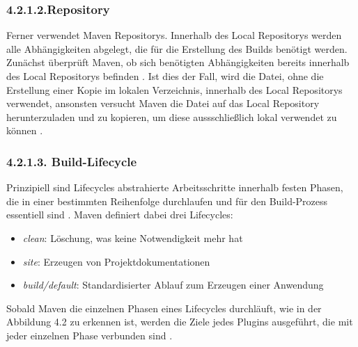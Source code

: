 \subsubsection{4.2.1.2.Repository}

Ferner verwendet Maven Repositorys. Innerhalb des Local Repositorys werden alle Abhängigkeiten abgelegt, die für die Erstellung des Builds benötigt werden. Zunächst überprüft Maven, ob sich benötigten Abhängigkeiten bereits innerhalb des Local Repositorys befinden \cite[S. 45 - 47]{loukides_maven_2008}. Ist dies der Fall, wird die Datei, ohne die Erstellung einer Kopie im lokalen Verzeichnis, innerhalb des Local Repositorys verwendet, ansonsten versucht Maven die Datei auf das Local Repository herunterzuladen und zu kopieren, um diese aussschließlich lokal verwendet zu können \cite[S. 115]{spiller_maven_2011}.   

\subsubsection{4.2.1.3. Build-Lifecycle}

Prinzipiell sind Lifecycles abstrahierte Arbeitsschritte innerhalb festen Phasen, die in einer bestimmten Reihenfolge durchlaufen und für den Build-Prozess essentiell sind \cite[S. 57]{varanasi_introducing_2019}.
Maven definiert dabei drei Lifecycles\cite[S. 72 - 76]{spiller_maven_2011}: 

\begin{itemize}
    \item \textit{clean}: Löschung, was keine Notwendigkeit mehr hat 

    \item \textit{site}: Erzeugen von Projektdokumentationen
    
    \item \textit{build/default}: Standardisierter Ablauf zum Erzeugen einer Anwendung 

\end{itemize}

Sobald Maven die einzelnen Phasen eines Lifecycles durchläuft, wie in der Abbildung 4.2 zu erkennen ist, werden die Ziele jedes Plugins ausgeführt, die mit jeder einzelnen Phase verbunden sind \cite[S. 39]{loukides_maven_2008}. 

